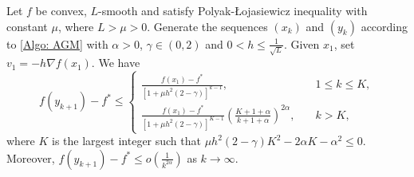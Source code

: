 \documentclass[onefignum,onetabnum]{siamart220329}
\begin{document}
\begin{theorem}\label{Thm: algo_PL}
Let $f$ be convex, $L$-smooth and satisfy Polyak-\L ojasiewicz inequality with constant $\mu$, where $L>\mu>0$. Generate the sequences $(x_k)$ and $(y_k)$ according to \eqref{Algo: AGM} with $\alpha>0$, $\gamma\in(0,2)$ and $0< h\le\frac{1}{\sqrt{L}}$.
Given $x_1$, set $v_1 = -h\nabla f(x_1)$. We have
\begin{equation*}
f(y_{k+1}) - f^*\le\left\{
\begin{array}{ll}
\frac{ f(x_1) - f^* }{ \left[ 1 + \mu h^2 (2-\gamma) \right]^{k-1} },&\quad 1\le k \le K,\\ [5pt]
\frac{f(x_1) - f^*}{\left[ 1 + \mu h^2 (2-\gamma) \right]^{K-1} } \left( \frac{K+1+\alpha}{k+1+\alpha} \right)^{2\alpha},&\quad k> K,
\end{array}
\right.
\end{equation*}
where $K$ is the largest integer such that $\mu h^2(2-\gamma)K^2-2\alpha K-\alpha^2\le 0$. Moreover, $f(y_{k+1}) - f^* \le o( \frac{1}{k^{2\alpha}})$ as $k\to\infty$.
\end{theorem}
\end{document}
